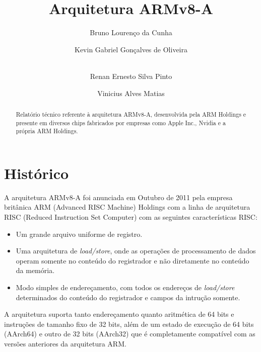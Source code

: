 \documentclass[12pt,a4paper,utf8]{ppgsi}
\title{Arquitetura ARMv8-A}
\author{Bruno Lourenço da Cunha\inst{1}
    \and Kevin Gabriel Gonçalves de Oliveira\inst{2}
    \and \\Renan Ernesto Silva Pinto\inst{3}
    \and Vinicius Alves Matias\inst{4}}
\begin{document}
\maketitle

\begin{abstract} 
    Relatório técnico referente à arquitetura ARMv8-A, desenvolvida pela ARM Holdings e presente em diversos chips fabricados por empresas como Apple Inc., Nvidia e a própria ARM Holdings.
\end{abstract}

\section{Histórico}
    A arquitetura ARMv8-A foi anunciada em Outubro de 2011 pela empresa britânica ARM (Advanced RISC Machine) Holdings com a linha de arquitetura RISC (Reduced Instruction Set Computer) com as seguintes características RISC:
    \begin{itemize}
      \item Um grande arquivo uniforme de registro.
      \item Uma arquitetura de \textit{load/store}, onde as operações de processamento de dados operam somente no conteúdo do registrador e não diretamente no conteúdo da memória.
      \item Modo simples de endereçamento, com todos os endereços de \textit{load/store} determinados do conteúdo do registrador e campos da intrução somente.
    \end{itemize}
    A arquitetura suporta tanto endereçamento quanto aritmética de 64 bits e instruções de tamanho fixo de 32 bits, além de um estado de execução de 64 bits (AArch64) e outro de 32 bits (AArch32) que é completamente compatível com as versões anteriores da arquitetura ARM. 
    
\end{document}
